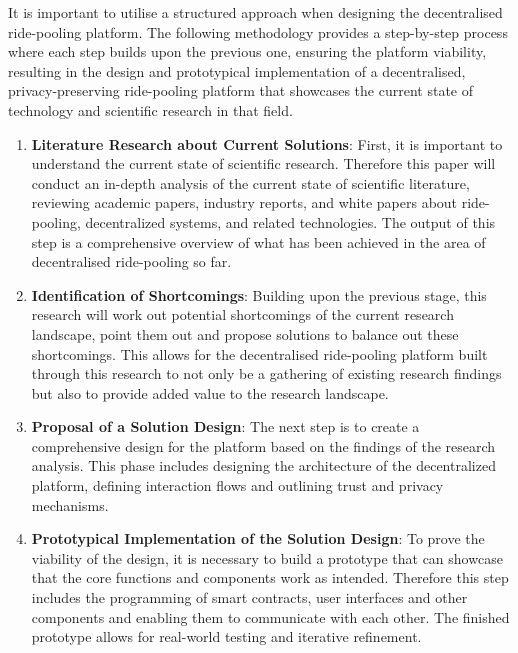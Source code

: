It is important to utilise a structured approach when designing the decentralised ride-pooling platform. The following methodology provides a step-by-step process where each step builds upon the previous one, ensuring the platform viability, resulting in the design and prototypical implementation of a decentralised, privacy-preserving ride-pooling platform that showcases the current state of technology and scientific research in that field.


\begin{enumerate}

    \item \textbf{Literature Research about Current Solutions}: 
    First, it is important to understand the current state of scientific research. Therefore this paper will conduct an in-depth analysis of the current state of scientific literature, reviewing academic papers, industry reports, and white papers about ride-pooling, decentralized systems, and related technologies. The output of this step is a comprehensive overview of what has been achieved in the area of decentralised ride-pooling so far.

    \item \textbf{Identification of Shortcomings}: 
    Building upon the previous stage, this research will work out potential shortcomings of the current research landscape, point them out and propose solutions to balance out these shortcomings. This allows for the decentralised ride-pooling platform built through this research to not only be a gathering of existing research findings but also to provide added value to the research landscape.

    \item \textbf{Proposal of a Solution Design}:
    The next step is to create a comprehensive design for the platform based on the findings of the research analysis. This phase includes designing the architecture of the decentralized platform, defining interaction flows and outlining trust and privacy mechanisms. 
    

    \item \textbf{Prototypical Implementation of the Solution Design}: 
    To prove the viability of the design, it is necessary to build a prototype that can showcase that the core functions and components work as intended. Therefore this step includes the programming of smart contracts, user interfaces and other components and enabling them to communicate with each other. The finished prototype allows for real-world testing and iterative refinement.


\end{enumerate}
